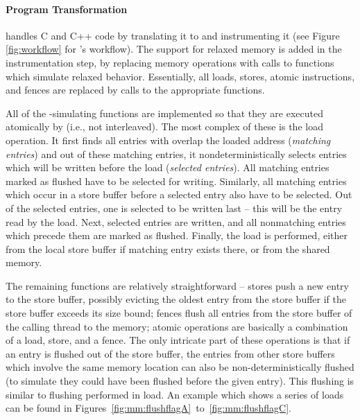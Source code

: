 \paragraph{Program Transformation}%
%
\divine handles C and C++ code by translating it to \llvm and instrumenting it (see Figure \ref{fig:workflow} for \divine's workflow).
The support for relaxed memory is added in the instrumentation step, by replacing memory operations with calls to functions which simulate relaxed behavior.
Essentially, all loads, stores, atomic instructions, and fences are replaced by calls to the appropriate functions.

All of the \xtso-simulating functions are implemented so that they are executed atomically by \divine (i.e., not interleaved).
The most complex of these is the load operation.
It first finds all entries with overlap the loaded address (\emph{matching entries}) and out of these matching entries, it nondeterministically selects entries which will be written before the load (\emph{selected entries}).
All matching entries marked as flushed have to be selected for writing.
Similarly, all matching entries which occur in a store buffer before a selected entry also have to be selected.
Out of the selected entries, one is selected to be written last -- this will be the entry read by the load.
Next, selected entries are written, and all nonmatching entries which precede them are marked as flushed.
Finally, the load is performed, either from the local store buffer if matching
entry exists there, or from the shared memory.

The remaining functions are relatively straightforward -- stores push a new
entry to the store buffer, possibly evicting the oldest entry from the store
buffer if the store buffer exceeds its size bound; fences flush all entries from the
store buffer of the calling thread to the memory; atomic operations are basically a
combination of a load, store, and a fence.
The only intricate part of these operations is that if an entry is flushed out
of the store buffer, the entries from other store buffers which involve the same memory location can also be non-deterministically flushed (to simulate they could have been flushed before the given entry).
This flushing is similar to flushing performed in load.
An example which shows a series of loads can be found in Figures~\ref{fig:mm:flushflagA}~to~\ref{fig:mm:flushflagC}.

